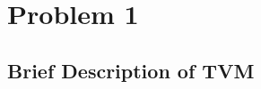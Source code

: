\documentclass[11pt,oneside]{book}
\begin{document}


\tableofcontents
\listoffigures
\listoftables



\mainmatter
\chapter{Problem 1}

\section{Brief Description of TVM}
\end{document}
